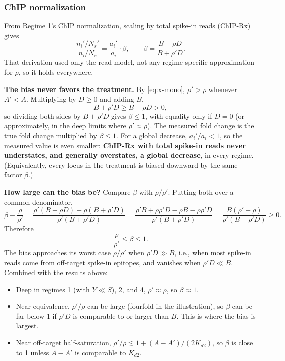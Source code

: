 \subsubsection{ChIP normalization}

From Regime 1's ChIP normalization, scaling by total spike-in reads
(ChIP-Rx) gives
$$
\frac{n_i'/N_s'}{n_i/N_s}
=\frac{a_i'}{a_i}\cdot\beta,
\qquad
\beta=\frac{B+\rho D}{B+\rho' D}.
$$
That derivation used only the read model, not any regime-specific
approximation for $\rho$, so it holds everywhere.

\textbf{The bias never favors the treatment.} By \eqref{eq:x-mono},
$\rho'>\rho$ whenever $A'<A$. Multiplying by $D\ge0$ and adding $B$,
$$
B+\rho' D\ge B+\rho D>0,
$$
so dividing both sides by $B+\rho'D$ gives $\beta\le1$, with equality only
if $D=0$ (or approximately, in the deep limits where $\rho'\approx\rho$). The
measured fold change is the true fold change multiplied by $\beta\le1$.
For a global decrease, $a_i'/a_i<1$, so the measured value is even smaller:
\textbf{ChIP-Rx with total spike-in reads never understates, and generally
overstates, a global decrease}, in every regime. (Equivalently, every locus
in the treatment is biased downward by the same factor $\beta$.)

\textbf{How large can the bias be?} Compare $\beta$ with $\rho/\rho'$.
Putting both over a common denominator,
$$
\beta-\frac{\rho}{\rho'}
=\frac{\rho'(B+\rho D)-\rho(B+\rho' D)}{\rho'(B+\rho' D)}
=\frac{\rho' B+\rho\rho' D-\rho B-\rho\rho' D}{\rho'(B+\rho' D)}
=\frac{B(\rho'-\rho)}{\rho'(B+\rho' D)}
\ge0.
$$
Therefore
$$
\frac{\rho}{\rho'}\le\beta\le1.
$$
The bias approaches its worst case $\rho/\rho'$ when $\rho'D\gg B$, i.e.,
when most spike-in reads come from off-target spike-in epitopes, and
vanishes when $\rho'D\ll B$. Combined with the results above:
\begin{itemize}
    \item Deep in regimes 1 (with $Y\ll S$), 2, and 4, $\rho'\approx\rho$,
    so $\beta\approx1$.
    \item Near equivalence, $\rho'/\rho$ can be large (fourfold in the
    illustration), so $\beta$ can be far below 1 if $\rho'D$ is comparable
    to or larger than $B$. This is where the bias is largest.
    \item Near off-target half-saturation, $\rho'/\rho\lesssim1+(A-A')/(2K_{d2})$,
    so $\beta$ is close to 1 unless $A-A'$ is comparable to $K_{d2}$.
\end{itemize}

